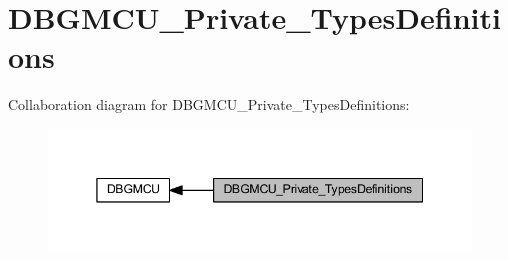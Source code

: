 \hypertarget{group___d_b_g_m_c_u___private___types_definitions}{}\section{D\+B\+G\+M\+C\+U\+\_\+\+Private\+\_\+\+Types\+Definitions}
\label{group___d_b_g_m_c_u___private___types_definitions}
Collaboration diagram for D\+B\+G\+M\+C\+U\+\_\+\+Private\+\_\+\+Types\+Definitions\+:
\nopagebreak
\begin{figure}[H]
\begin{center}
\leavevmode
\includegraphics[width=345pt]{group___d_b_g_m_c_u___private___types_definitions}
\end{center}
\end{figure}
